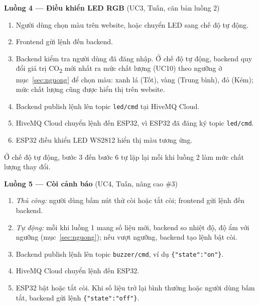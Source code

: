 \documentclass[12pt,a4paper]{article}
\begin{document}
\noindent\begin{minipage}{\linewidth}
\setlength{\parskip}{4pt}
\textbf{Luồng 4 --- Điều khiển LED RGB} (UC3, Tuấn, căn bản luồng 2)
\begin{enumerate}[leftmargin=2em]
  \item Người dùng chọn màu trên website, hoặc chuyển LED sang chế độ tự động.
  \item Frontend gửi lệnh đến backend.
  \item Backend kiểm tra người dùng đã đăng nhập. Ở chế độ tự động, backend quy đổi giá trị CO\textsubscript{2} mới nhất ra mức chất lượng (UC10) theo ngưỡng ở mục~\ref{sec:nguong} để chọn màu: xanh lá (Tốt), vàng (Trung bình), đỏ (Kém); mức chất lượng cũng được hiển thị trên website.
  \item Backend publish lệnh lên topic \texttt{led/cmd} tại HiveMQ Cloud.
  \item HiveMQ Cloud chuyển lệnh đến ESP32, vì ESP32 đã đăng ký topic \texttt{led/cmd}.
  \item ESP32 điều khiển LED WS2812 hiển thị màu tương ứng.
\end{enumerate}
Ở chế độ tự động, bước 3 đến bước 6 tự lặp lại mỗi khi luồng 2 làm mức chất lượng thay đổi.
\end{minipage}
\par\medskip

\noindent\begin{minipage}{\linewidth}
\setlength{\parskip}{4pt}
\textbf{Luồng 5 --- Còi cảnh báo} (UC4, Tuấn, nâng cao \#3)
\begin{enumerate}[leftmargin=2em]
  \item \emph{Thủ công:} người dùng bấm nút thử còi hoặc tắt còi; frontend gửi lệnh đến backend.
  \item \emph{Tự động:} mỗi khi luồng 1 mang số liệu mới, backend so nhiệt độ, độ ẩm với ngưỡng (mục~\ref{sec:nguong}); nếu vượt ngưỡng, backend tạo lệnh bật còi.
  \item Backend publish lệnh lên topic \texttt{buzzer/cmd}, ví dụ \texttt{\{"state":"on"\}}.
  \item HiveMQ Cloud chuyển lệnh đến ESP32.
  \item ESP32 bật hoặc tắt còi. Khi số liệu trở lại bình thường hoặc người dùng bấm tắt, backend gửi lệnh \texttt{\{"state":"off"\}}.
\end{enumerate}
\end{minipage}
\par\medskip
\end{document}
